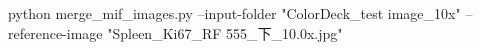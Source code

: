python merge_mif_images.py --input-folder "ColorDeck_test image_10x" --reference-image "Spleen_Ki67_RF 555_下_10.0x.jpg"
